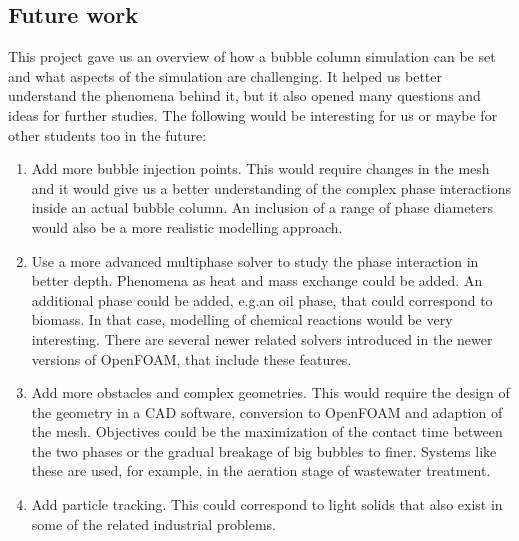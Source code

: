 \documentclass[11pt, a4paper, twoside]{article}
\begin{document}
\subsection{Future work}
This project gave us an overview of how a bubble column simulation can be set and what aspects of the simulation are challenging. It helped us better understand the phenomena behind it, but it also opened many questions and ideas for further studies. The following would be interesting for us or maybe for other students too in the future:
\begin{enumerate}
    \item Add more bubble injection points. This would require changes in the mesh and it would give us a better understanding of the complex phase interactions inside an actual bubble column. An inclusion of a range of phase diameters would also be a more realistic modelling approach.
    \item Use a more advanced multiphase solver to study the phase interaction in better depth. Phenomena as heat and mass exchange could be added. An additional phase could be added, e.g.\@ an oil phase, that could correspond to biomass. In that case, modelling of chemical reactions would be very interesting. There are several newer related solvers introduced in the newer versions of OpenFOAM, that include these features.
    \item Add more obstacles and complex geometries. This would require the design of the geometry in a CAD software, conversion to OpenFOAM and adaption of the mesh. Objectives could be the maximization of the contact time between the two phases or the gradual breakage of big bubbles to finer. Systems like these are used, for example, in the aeration stage of wastewater treatment.
    \item Add particle tracking. This could correspond to light solids that also exist in some of the related industrial problems.
\end{enumerate}


\end{document}
